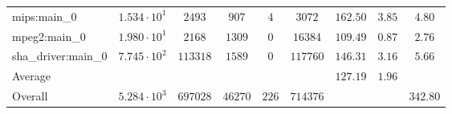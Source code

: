 \begin{tabular}{|l|c|c|c|c|c|c|c|c|}
mips:main\_0            & $ 1.534 \cdot 10^{1}  $ & $ 2493   $ & $ 907   $ & $ 4   $ & $ 3072   $ & $ 162.50      $ & $ 3.85    $ & $ 4.80    $ \\
mpeg2:main\_0           & $ 1.980 \cdot 10^{1}  $ & $ 2168   $ & $ 1309  $ & $ 0   $ & $ 16384  $ & $ 109.49      $ & $ 0.87    $ & $ 2.76    $ \\
sha\_driver:main\_0     & $ 7.745 \cdot 10^{2}  $ & $ 113318 $ & $ 1589  $ & $ 0   $ & $ 117760 $ & $ 146.31      $ & $ 3.16    $ & $ 5.66    $ \\
\hline
Average                 & $                     $ & $        $ & $       $ & $     $ & $        $ & $ 127.19      $ & $ 1.96    $ & $         $ \\
\hline
Overall                 & $ 5.284 \cdot 10^{3}  $ & $ 697028 $ & $ 46270 $ & $ 226 $ & $ 714376 $ & $             $ & $         $ & $ 342.80  $ \\
\hline
\end{tabular}
